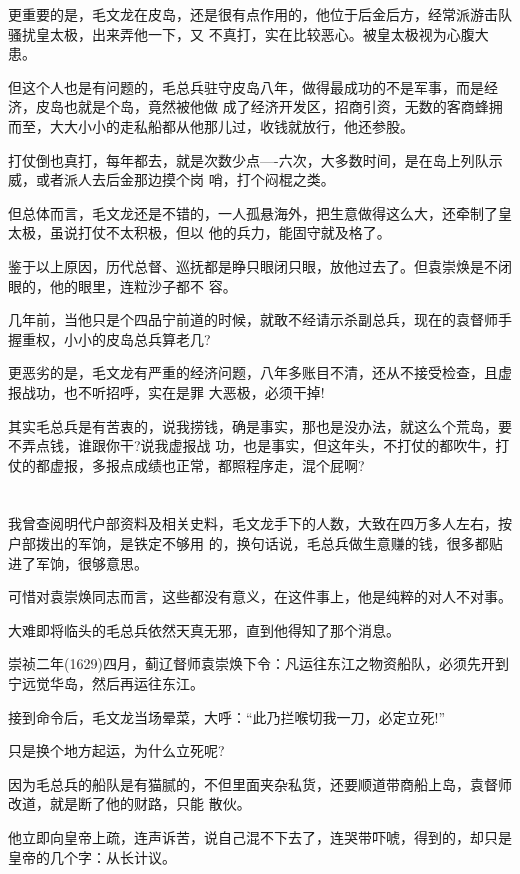 \documentclass[11pt,a4paper,onecolumn]{article}
\begin{document}
更重要的是，毛文龙在皮岛，还是很有点作用的，他位于后金后方，经常派游击队骚扰皇太极，出来弄他一下，又
不真打，实在比较恶心。被皇太极视为心腹大患。

但这个人也是有问题的，毛总兵驻守皮岛八年，做得最成功的不是军事，而是经济，皮岛也就是个岛，竟然被他做
成了经济开发区，招商引资，无数的客商蜂拥而至，大大小小的走私船都从他那儿过，收钱就放行，他还参股。

打仗倒也真打，每年都去，就是次数少点----六次，大多数时间，是在岛上列队示威，或者派人去后金那边摸个岗
哨，打个闷棍之类。

但总体而言，毛文龙还是不错的，一人孤悬海外，把生意做得这么大，还牵制了皇太极，虽说打仗不太积极，但以
他的兵力，能固守就及格了。

鉴于以上原因，历代总督、巡抚都是睁只眼闭只眼，放他过去了。但袁崇焕是不闭眼的，他的眼里，连粒沙子都不
容。

几年前，当他只是个四品宁前道的时候，就敢不经请示杀副总兵，现在的袁督师手握重权，小小的皮岛总兵算老几?

更恶劣的是，毛文龙有严重的经济问题，八年多账目不清，还从不接受检查，且虚报战功，也不听招呼，实在是罪
大恶极，必须干掉!

其实毛总兵是有苦衷的，说我捞钱，确是事实，那也是没办法，就这么个荒岛，要不弄点钱，谁跟你干?说我虚报战
功，也是事实，但这年头，不打仗的都吹牛，打仗的都虚报，多报点成绩也正常，都照程序走，混个屁啊?

\section[\thesection]{}

我曾查阅明代户部资料及相关史料，毛文龙手下的人数，大致在四万多人左右，按户部拨出的军饷，是铁定不够用
的，换句话说，毛总兵做生意赚的钱，很多都贴进了军饷，很够意思。

可惜对袁崇焕同志而言，这些都没有意义，在这件事上，他是纯粹的对人不对事。

大难即将临头的毛总兵依然天真无邪，直到他得知了那个消息。

崇祯二年(1629)四月，蓟辽督师袁崇焕下令：凡运往东江之物资船队，必须先开到宁远觉华岛，然后再运往东江。

接到命令后，毛文龙当场晕菜，大呼：``此乃拦喉切我一刀，必定立死!''

只是换个地方起运，为什么立死呢?

因为毛总兵的船队是有猫腻的，不但里面夹杂私货，还要顺道带商船上岛，袁督师改道，就是断了他的财路，只能
散伙。

他立即向皇帝上疏，连声诉苦，说自己混不下去了，连哭带吓唬，得到的，却只是皇帝的几个字：从长计议。
\end{document}
